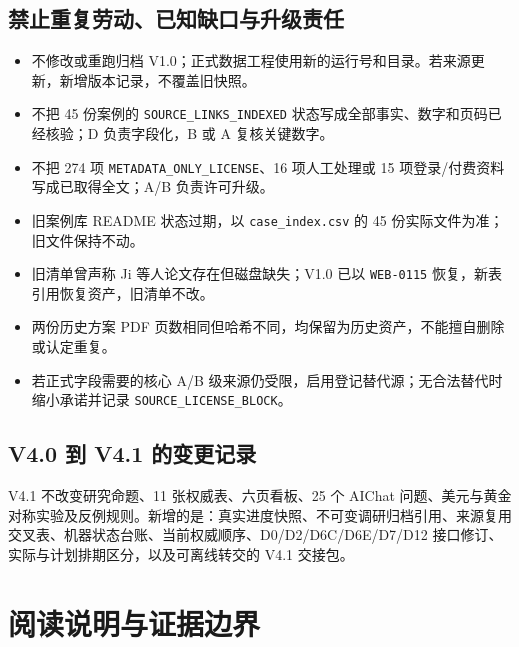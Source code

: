 \documentclass[UTF8,fontset=windows,12pt,openany]{ctexbook}
\newcommand{\Field}[1]{{\small\nolinkurl{#1}}}
\newcommand{\File}[1]{{\small\begingroup\urlstyle{same}\nolinkurl{#1}\endgroup}}
\begin{document}
\section*{禁止重复劳动、已知缺口与升级责任}

\begin{itemize}
  \item 不修改或重跑归档 V1.0；正式数据工程使用新的运行号和目录。若来源更新，新增版本记录，不覆盖旧快照。
  \item 不把 45 份案例的 \Field{SOURCE_LINKS_INDEXED} 状态写成全部事实、数字和页码已经核验；D 负责字段化，B 或 A 复核关键数字。
  \item 不把 274 项 \Field{METADATA_ONLY_LICENSE}、16 项人工处理或 15 项登录/付费资料写成已取得全文；A/B 负责许可升级。
  \item 旧案例库 README 状态过期，以 \File{case_index.csv} 的 45 份实际文件为准；旧文件保持不动。
  \item 旧清单曾声称 Ji 等人论文存在但磁盘缺失；V1.0 已以 \Field{WEB-0115} 恢复，新表引用恢复资产，旧清单不改。
  \item 两份历史方案 PDF 页数相同但哈希不同，均保留为历史资产，不能擅自删除或认定重复。
  \item 若正式字段需要的核心 A/B 级来源仍受限，启用登记替代源；无合法替代时缩小承诺并记录 \Field{SOURCE_LICENSE_BLOCK}。
\end{itemize}

\section*{V4.0 到 V4.1 的变更记录}

V4.1 不改变研究命题、11 张权威表、六页看板、25 个 AIChat 问题、美元与黄金对称实验及反例规则。新增的是：真实进度快照、不可变调研归档引用、来源复用交叉表、机器状态台账、当前权威顺序、D0/D2/D6C/D6E/D7/D12 接口修订、实际与计划排期区分，以及可离线转交的 V4.1 交接包。

\chapter*{阅读说明与证据边界}
\end{document}
